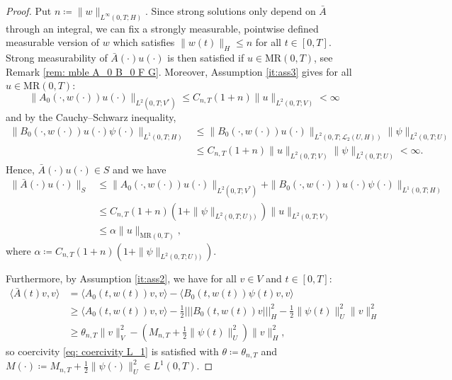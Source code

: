 \documentclass{amsart}
\renewcommand{\MR}{\mathrm{MR}}
\newcommand{\UH}{\mathcal{L}_2(U,H)}
\newcommand{\<}{\langle}
\newcommand{\?}{\rangle}
\newcommand{\nn}{|\!|\!|}
\theoremstyle{plain}
\theoremstyle{remark}
\theoremstyle{plain}
\numberwithin{equation}{section}
\begin{document}
\begin{proof}
Put $n\coloneqq \|w\|_{L^\infty(0,T;H)}$.
Since strong solutions only depend on $\bar{A}$ through an integral, we can fix a strongly measurable, pointwise defined measurable version of $w$ which satisfies $\|w(t)\|_H\leq n$ for all $t\in[0,T]$.
Strong measurability of $\bar{A}(\cdot)u(\cdot)$ is then satisfied if $u\in\MR(0,T)$, see Remark \ref{rem: mble A_0 B_0 F G}. Moreover, Assumption \ref{it:ass3} gives for all $u\in \MR(0,T)$:
\[
\|A_0(\cdot,w(\cdot))u(\cdot)\|_{L^2(0,T;V^*)} \leq C_{n,T}(1+n)\|u\|_{L^2(0,T;V)}<\infty
\]
and by the Cauchy--Schwarz inequality,
\begin{align*}
\|B_0(\cdot,w(\cdot))u(\cdot)\psi(\cdot)\|_{L^1(0,T;H)}
&\leq  \|B_0(\cdot,w(\cdot))u(\cdot)\|_{L^2(0,T;\UH)}\|\psi\|_{L^2(0,T;U)}  \\
& \leq   C_{n,T}(1+n)\|u \|_{L^2(0,T;V)} \|\psi\|_{L^2(0,T;U)}<\infty.
\end{align*}
Hence, $\bar{A}(\cdot)u(\cdot)\in S$ and we have
\begin{align*}
 \|\bar{A}(\cdot)u(\cdot)\|_S&\leq  \|A_0(\cdot,w(\cdot))u(\cdot)\|_{L^2(0,T;V^*)}+\|B_0(\cdot,w(\cdot))u(\cdot)\psi(\cdot)\|_{L^1(0,T;H)}\\
 &\leq C_{n,T}(1+n)(1+\|\psi\|_{L^2(0,T;U))})\|u\|_{L^2(0,T;V)}\\
  &\leq \alpha \|u\|_{\MR(0,T)},
\end{align*}
where $\alpha\coloneqq C_{n,T}(1+n)(1+\|\psi\|_{L^2(0,T;U))})$.

Furthermore, by Assumption \ref{it:ass2}, we have for all $v\in V$ and $t\in[0,T]$:
    \begin{align*}
    \<\bar{A}(t)v,v\?&=\<A_0(t,w(t))v,v\?-\<B_0(t,w(t))\psi(t)v,v\?\\
    &\geq \<A_0(t,w(t))v,v\?- \frac{1}{2}\nn B_0(t,w(t))v \nn_H^2-\frac{1}{2}\|\psi(t)\|_U^2\|v\|_H^2\\
    &\geq \theta_{n,T}\|v\|_V^2-({M}_{n,T}+\frac{1}{2}\|\psi(t)\|_U^2)\|v\|_H^2,
  \end{align*}
  so coercivity \eqref{eq: coercivity L_1} is satisfied with ${\theta}\coloneqq \theta_{n,T}$ and  ${M}(\cdot)\coloneqq {M}_{n,T}+\frac{1}{2}\|\psi(\cdot)\|_U^2\in L^1(0,T)$.


\end{proof}
\end{document}
